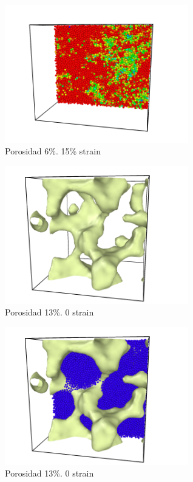 \documentclass[10pt, oneside]{article} %
\begin{document}
\begin{figure}[H]
\centering
\includegraphics[width=8cm]{Figures/Porosidad/9_15strain_color.png}
\caption{Porosidad 6\%. 15\% strain}
\end{figure}

\begin{figure}[H]
\centering
\includegraphics[width=8cm]{Figures/Porosidad/18_0strain.png}
\caption{Porosidad 13\%. 0 strain}
\end{figure}

\begin{figure}[H]
\centering
\includegraphics[width=8cm]{Figures/Porosidad/18_0strain_color.png}
\caption{Porosidad 13\%. 0 strain}
\end{figure}
\end{document}
